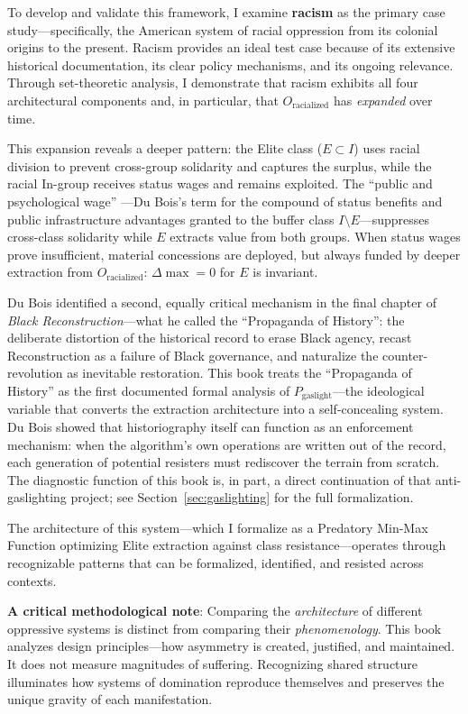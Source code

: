 To develop and validate this framework, I examine \textbf{racism} as the primary case study---specifically, the American system of racial oppression from its colonial origins to the present. Racism provides an ideal test case because of its extensive historical documentation, its clear policy mechanisms, and its ongoing relevance. Through set-theoretic analysis, I demonstrate that racism exhibits all four architectural components and, in particular, that $O_{\text{racialized}}$ has \textit{expanded} over time.

This expansion reveals a deeper pattern: the Elite class ($E \subset I$) uses racial division to prevent cross-group solidarity and captures the surplus, while the racial In-group receives status wages and remains exploited. The ``public and psychological wage'' \cite{dubois, roediger}---Du Bois's term for the compound of status benefits and public infrastructure advantages granted to the buffer class $I \setminus E$---suppresses cross-class solidarity while $E$ extracts value from both groups. When status wages prove insufficient, material concessions are deployed, but always funded by deeper extraction from $O_{\text{racialized}}$: $\Delta\max = 0$ for $E$ is invariant.

Du Bois identified a second, equally critical mechanism in the final chapter of \textit{Black Reconstruction}---what he called the ``Propaganda of History'': the deliberate distortion of the historical record to erase Black agency, recast Reconstruction as a failure of Black governance, and naturalize the counter-revolution as inevitable restoration. This book treats the ``Propaganda of History'' as the first documented formal analysis of $P_{\text{gaslight}}$---the ideological variable that converts the extraction architecture into a self-concealing system. Du Bois showed that historiography itself can function as an enforcement mechanism: when the algorithm's own operations are written out of the record, each generation of potential resisters must rediscover the terrain from scratch. The diagnostic function of this book is, in part, a direct continuation of that anti-gaslighting project; see Section~\ref{sec:gaslighting} for the full formalization.

The architecture of this system---which I formalize as a Predatory Min-Max Function optimizing Elite extraction against class resistance---operates through recognizable patterns that can be formalized, identified, and resisted across contexts.

\textbf{A critical methodological note}: Comparing the \textit{architecture} of different oppressive systems is distinct from comparing their \textit{phenomenology}. This book analyzes design principles---how asymmetry is created, justified, and maintained. It does not measure magnitudes of suffering. Recognizing shared structure illuminates how systems of domination reproduce themselves and preserves the unique gravity of each manifestation.

